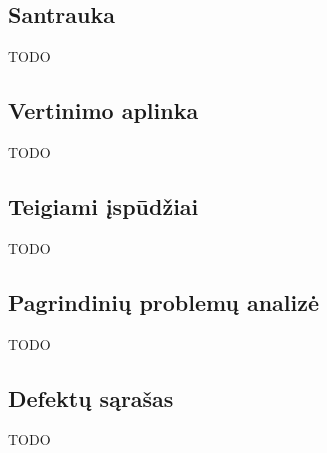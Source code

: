 \subsection{Santrauka}
TODO

\newpage
\subsection{Vertinimo aplinka}
TODO

\newpage
\subsection{Teigiami įspūdžiai}
TODO

\newpage
\subsection{Pagrindinių problemų analizė}
TODO

\newpage
\subsection{Defektų sąrašas}
TODO

